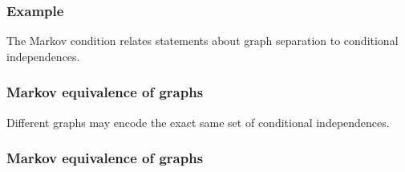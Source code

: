 \documentclass{beamer}
\begin{document}
\begin{frame}
    \frametitle{Example} 
    \begin{flushleft}
        The Markov condition relates statements about graph separation to conditional
        independences.
    \end{flushleft}
\end{frame}

\begin{frame}
    \frametitle{Markov equivalence of graphs} 
    \begin{flushleft}
        Different graphs may encode the exact same set of conditional independences.
    \end{flushleft}
\end{frame}

\begin{frame}
    \frametitle{Markov equivalence of graphs} 
\end{frame}
\end{document}
